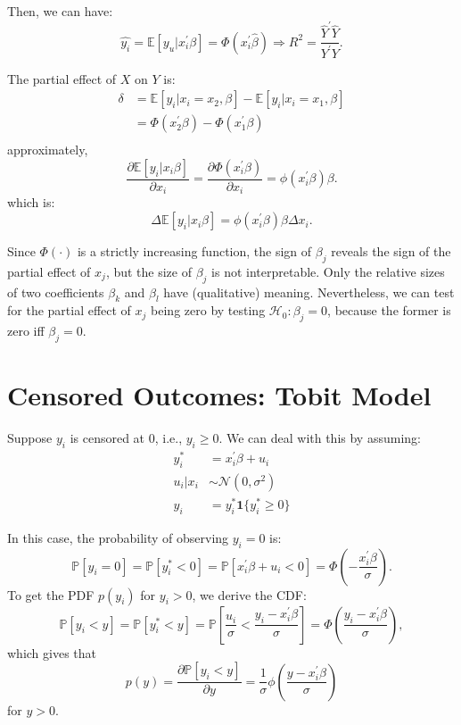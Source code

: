 Then, we can have:
\[ 
\hat{y_i} = \mathbb{E}[y_u|x_i^{\prime} \beta ] = \Phi(x_i^{\prime} \hat{\beta}) \Rightarrow R^2 = \frac{\hat{Y}^{\prime} \hat{Y}}{Y^{\prime} Y}.
\]

The partial effect of $X$ on $Y$ is:
\begin{align*}
    \delta &= \mathbb{E}[y_i|x_i=x_2, \beta] - \mathbb{E}[y_i|x_i=x_1, \beta] \\
    &= \Phi(x_2^{\prime} \beta ) - \Phi(x_1^{\prime} \beta )\\
\end{align*}
approximately,
\[
\frac{\partial \mathbb{E}[y_i|x_i \beta]}{\partial x_i} = \frac{\partial \Phi(x_i^{\prime} \beta)}{\partial x_i} = \phi(x_i^{\prime} \beta) \beta.
\]
which is: 
\[
\Delta \mathbb{E}[y_i|x_i \beta] = \phi(x_i^{\prime} \beta ) \beta \Delta x_i.
\]

Since $\Phi(\cdot)$ is a strictly increasing function, 
the sign of $\beta_j$ reveals the sign of the partial effect of $x_{j}$,
but the size of $\beta_{j}$ is not interpretable. 
Only the relative sizes of two coefficients $\beta_k$ and $\beta_{l}$ 
have (qualitative) meaning. Nevertheless, 
we can test for the partial effect of $x_j$ being zero 
by testing $\mathcal{H}_0:\beta_j=0$, 
because the former is zero iff $\beta_j=0.$

\section{Censored Outcomes: Tobit Model}

Suppose $y_i$ is censored at 0, i.e., $y_i \geq 0$.
We can deal with this by assuming:
\begin{align*}
    y_i^* &= x_i^{\prime} \beta + u_i\\
    u_i|x_i &\sim \mathcal{N}(0, \sigma^2)\\
    y_i &= y_i^* \mathbf{1}\{y_i^* \geq 0\}
\end{align*}

In this case, the probability of observing $y_i=0$ is:
\[
\mathbb{P}[y_i=0] = \mathbb{P}[y_i^* < 0] = \mathbb{P}[x_i^{\prime} \beta + u_i < 0] = \Phi\left(-\frac{x_i^{\prime} \beta}{\sigma}\right).
\]
To get the PDF $p(y_i)$ for $y_{i}>0$, we derive the CDF:
\[ 
\mathbb{P}[y_i < y] = \mathbb{P}[y_i^* < y] = \mathbb{P}\left[\frac{u_i}{\sigma} < \frac{y_{i}-x_i^{\prime} \beta}{\sigma}\right] = \Phi\left(\frac{y_i - x_i^{\prime} \beta}{\sigma}\right),
\]
which gives that
\[
p(y) = \frac{\partial \mathbb{P}[y_i < y]}{\partial y} = \frac{1}{\sigma} \phi\left(\frac{y - x_i^{\prime} \beta}{\sigma}\right)
\]
for $y>0$.

